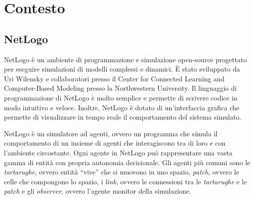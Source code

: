 \chapter{Contesto}
\section{NetLogo}
NetLogo\space\cite{wilensky1997netlogo} è un ambiente di programmazione e simulazione open-source
progettato per eseguire simulazioni di modelli complessi e dinamici. È stato sviluppato da Uri Wilensky
e collaboratori presso il Center for Connected Learning and Computer-Based Modeling presso la Northwestern University.
Il linguaggio di programmazione di NetLogo è molto semplice e permette di scrivere codice in modo
intuitivo e veloce. Inoltre, NetLogo è dotato di un'interfaccia grafica che permette di visualizzare
in tempo reale il comportamento del sistema simulato. 

NetLogo è un simulatore ad agenti, ovvero un
programma che simula il comportamento di un insieme di agenti che interagiscono tra di loro e con
l'ambiente circostante. Ogni agente in NetLogo può rappresentare una vasta gamma di entità con propria autonomia
decisionale. Gli agenti più comuni sono le \textit{tartarughe}, ovvero entità ``vive'' che si muovono in uno spazio,
\textit{patch}, ovvero le celle che compongono lo spazio, i \textit{link}, ovvero le connessioni tra le \textit{tartarughe} e 
le \textit{patch} e gli \textit{observer}, ovvero l'agente monitor della simulazione.

